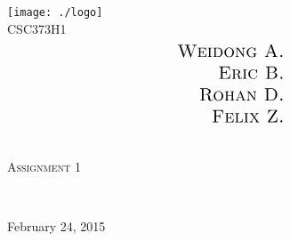 \begin{titlepage}
\begin{center}

\texttt{[image: ./logo]}~\\[1cm]

\textsc{\LARGE CSC373H1}\\[1.5cm]

\begin{align*}
\text{\textsc{\Large Weidong A.}} \\
\text{\textsc{\Large Eric B.}} \\
\text{\textsc{\Large Rohan D.}} \\
\text{\textsc{\Large Felix Z.}}  
\end{align*}

\HRule \\[0.4cm]
\textsc{ \huge Assignment 1 \\[0.4cm]}

\HRule \\[1.5cm]



\vfill

{\large February 24, 2015}

\end{center}
\end{titlepage}